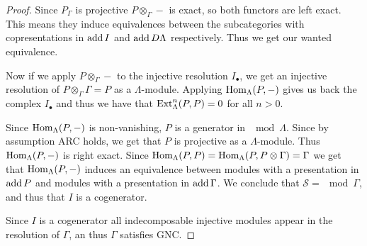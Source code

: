 \begin{theorem}
\begin{proof}
		Since $P_\Gamma$ is projective $P\otimes_\Gamma -$ is exact, so both functors are left exact. This means they induce equivalences between the subcategories with copresentations in $\operatorname{add} I$ and $\operatorname{add} D\Lambda$ respectively. Thus we get our wanted equivalence.
		
		Now if we apply $P\otimes_\Gamma -$ to the injective resolution $I_\bullet$, we get an injective resolution of $P\otimes_\Gamma\Gamma = P$ as a $\Lambda$-module. Applying $\operatorname{Hom}_\Lambda(P, -)$ gives us back the complex $I_\bullet$ and thus we have that $\operatorname{Ext}_\Lambda^n(P, P)=0$ for all $n>0$. 
		
		Since $\operatorname{Hom}_\Lambda(P, -)$ is non-vanishing, $P$ is a generator in $\mod\Lambda$. Since by assumption ARC holds, we get that $P$ is projective as a $\Lambda$-module. Thus $\operatorname{Hom}_\Lambda(P, -)$ is right exact. Since $\operatorname{Hom}_\Lambda(P, P) = \operatorname{Hom}_\Lambda(P, P\otimes \Gamma) = \Gamma$ we get that $\operatorname{Hom}_\Lambda(P,-)$ induces an equivalence between modules with a presentation in $\operatorname{add} P$ and modules with a presentation in $\operatorname{add} \Gamma$. We conclude that $\mathcal S = \mod\Gamma$, and thus that $I$ is a cogenerator.
		
		Since $I$ is a cogenerator all indecomposable injective modules appear in the resolution of $\Gamma$, an thus $\Gamma$ satisfies GNC.
	\end{proof}
\end{theorem}
%
%		
%		
